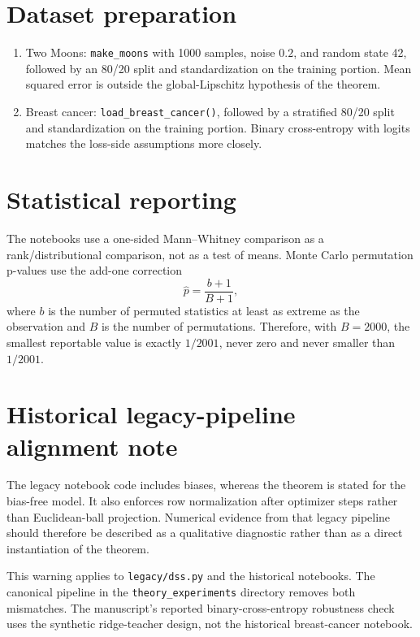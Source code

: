 \documentclass[11pt,a4paper]{article}
\begin{document}
\section*{Dataset preparation}

\begin{enumerate}
\item Two Moons: \texttt{make\_moons} with 1000 samples, noise $0.2$, and random state 42, followed by an 80/20 split and standardization on the training portion. Mean squared error is outside the global-Lipschitz hypothesis of the theorem.
\item Breast cancer: \texttt{load\_breast\_cancer()}, followed by a stratified 80/20 split and standardization on the training portion. Binary cross-entropy with logits matches the loss-side assumptions more closely.
\end{enumerate}

\section*{Statistical reporting}

The notebooks use a one-sided Mann--Whitney comparison as a rank/distributional comparison, not as a test of means. Monte Carlo permutation p-values use the add-one correction
\[
\widehat p=\frac{b+1}{B+1},
\]
where $b$ is the number of permuted statistics at least as extreme as the observation and $B$ is the number of permutations. Therefore, with $B=2000$, the smallest reportable value is exactly $1/2001$, never zero and never smaller than $1/2001$.

\section*{Historical legacy-pipeline alignment note}

The legacy notebook code includes biases, whereas the theorem is stated for the bias-free model. It also enforces row normalization after optimizer steps rather than Euclidean-ball projection. Numerical evidence from that legacy pipeline should therefore be described as a qualitative diagnostic rather than as a direct instantiation of the theorem.

This warning applies to \texttt{legacy/dss.py} and the historical notebooks. The canonical pipeline in the \texttt{theory\_experiments} directory removes both mismatches. The manuscript's reported binary-cross-entropy robustness check uses the synthetic ridge-teacher design, not the historical breast-cancer notebook.
\end{document}
